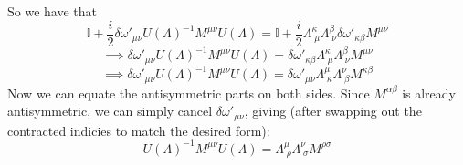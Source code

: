 \documentclass[12pt]{article}
\begin{document}
So we have that
\[ \mathbb{I} + \frac{i}{2}\delta{\omega'}_{\mu\nu}U(\Lambda)^{-1}M^{\mu\nu}U(\Lambda) = \mathbb{I} + \frac{i}{2}\Lambda_{\;\mu}^\kappa\Lambda_{\;\nu}^\beta\delta{\omega'}_{\kappa\beta}M^{\mu\nu} \]
\[ \implies \delta{\omega'}_{\mu\nu}U(\Lambda)^{-1}M^{\mu\nu}U(\Lambda) = \delta{\omega'}_{\kappa\beta}\Lambda_{\;\mu}^\kappa\Lambda_{\;\nu}^\beta M^{\mu\nu} \]
\[ \implies \delta{\omega'}_{\mu\nu}U(\Lambda)^{-1}M^{\mu\nu}U(\Lambda) = \delta{\omega'}_{\mu\nu}\Lambda_{\;\kappa}^\mu\Lambda_{\;\beta}^\nu M^{\kappa\beta} \]
Now we can equate the antisymmetric parts on both sides. Since $M^{\alpha\beta}$ is already antisymmetric, we can simply cancel $\delta{\omega'}_{\mu\nu}$, giving (after swapping out the contracted indicies to match the desired form):
\[ \boxed{U(\Lambda)^{-1}M^{\mu\nu}U(\Lambda) = \Lambda_{\;\rho}^\mu\Lambda_{\;\sigma}^\nu M^{\rho\sigma}} \]
\end{document}
